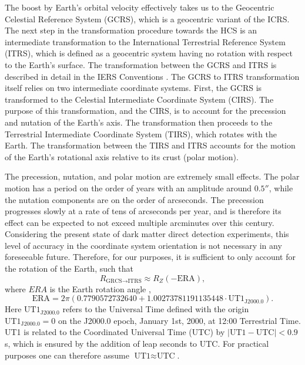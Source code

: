 \documentclass[b5paper, 10pt, twoside]{book}
\begin{document}
The boost by Earth's orbital velocity effectively takes us to the Geocentric Celestial Reference System (GCRS), which is a geocentric variant of the ICRS. The next step in the transformation procedure towards the HCS is an intermediate transformation to the International Terrestrial Reference System (ITRS), which is defined as a geocentric system having no rotation with respect to the Earth's surface. The transformation between the GCRS and ITRS is described in detail in the IERS Conventions \parencite{LuzumPetit2010}. The GCRS to ITRS transformation itself relies on two intermediate coordinate systems. First, the GCRS is transformed to the Celestial Intermediate Coordinate System (CIRS). The purpose of this transformation, and the CIRS, is to account for the precession and nutation of the Earth's axis. The transformation then proceeds to the Terrestrial Intermediate Coordinate System (TIRS), which rotates with the Earth. The transformation between the TIRS and ITRS accounts for the motion of the Earth's rotational axis relative to its crust (polar motion).

The precession, nutation, and polar motion are extremely small effects. The polar motion has a period on the order of years with an amplitude around $0.5''$, while the nutation components are on the order of arcseconds. The precession progresses slowly at a rate of tens of arcseconds per year, and is therefore its effect can be expected to not exceed multiple arcminutes over this century. Considering the present state of dark matter direct detection experiments, this level of accuracy in the coordinate system orientation is not necessary in any foreseeable future. Therefore, for our purposes, it is sufficient to only account for the rotation of the Earth, such that
\begin{equation}
    R_{\text{GRCS}\rightarrow\text{ITRS}}\approx R_Z(-\text{ERA}),
\end{equation}
where $ERA$ is the Earth rotation angle \parencite{LuzumPetit2010},
\begin{equation}
    \text{ERA}=2\pi(0.7790572732640+1.00273781191135448\cdot\text{UT1}_\text{J2000.0}).
\end{equation}
Here $\text{UT1}_\text{J2000.0}$ refers to the Universal Time defined with the origin $\text{UT1}_\text{J2000.0}=0$ on the J2000.0 epoch, January 1st, 2000, at 12:00 Terrestrial Time. UT1 is related to the Coordinated Universal Time (UTC) by $|\text{UT1}-\text{UTC}|<0.9$ s, which is ensured by the addition of leap seconds to UTC. For practical purposes one can therefore assume $\text{UT1}\approx\text{UTC}$.
\end{document}
